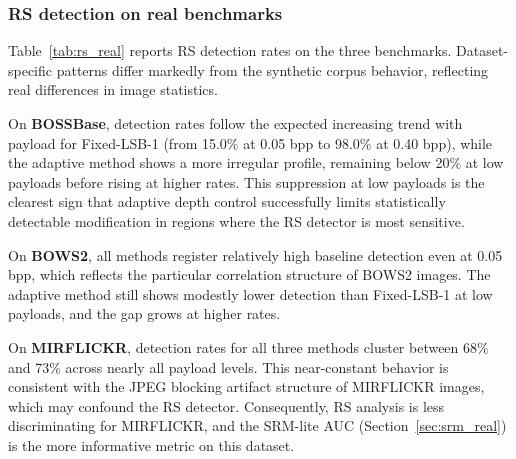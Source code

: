 \subsubsection{RS detection on real benchmarks}

Table~\ref{tab:rs_real} reports RS detection rates on the three benchmarks. Dataset-specific patterns differ markedly from the synthetic corpus behavior, reflecting real differences in image statistics.

On \textbf{BOSSBase}, detection rates follow the expected increasing trend with payload for Fixed-LSB-1 (from 15.0\% at 0.05 bpp to 98.0\% at 0.40 bpp), while the adaptive method shows a more irregular profile, remaining below 20\% at low payloads before rising at higher rates. This suppression at low payloads is the clearest sign that adaptive depth control successfully limits statistically detectable modification in regions where the RS detector is most sensitive.

On \textbf{BOWS2}, all methods register relatively high baseline detection even at 0.05 bpp, which reflects the particular correlation structure of BOWS2 images. The adaptive method still shows modestly lower detection than Fixed-LSB-1 at low payloads, and the gap grows at higher rates.

On \textbf{MIRFLICKR}, detection rates for all three methods cluster between 68\% and 73\% across nearly all payload levels. This near-constant behavior is consistent with the JPEG blocking artifact structure of MIRFLICKR images, which may confound the RS detector. Consequently, RS analysis is less discriminating for MIRFLICKR, and the SRM-lite AUC (Section~\ref{sec:srm_real}) is the more informative metric on this dataset.

